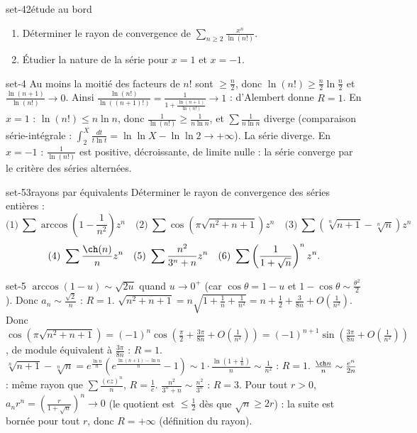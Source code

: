 \begin{exo}{set-4}{2}{étude au bord}
\begin{enumerate}
\item Déterminer le rayon de convergence de $\sum_{n\geq2}\frac{x^n}{\ln(n!)}$.
\item Étudier la nature de la série pour $x=1$ et $x=-1$.
\end{enumerate}
\end{exo}

\begin{corrige}{set-4}
 Au moins la moitié des facteurs de $n!$ sont $\geq\frac n2$, donc $\ln(n!)\geq\frac n2\ln\frac n2$ et $\frac{\ln(n+1)}{\ln(n!)}\to0$. Ainsi
$\frac{\ln(n!)}{\ln((n+1)!)}=\frac1{1+\frac{\ln(n+1)}{\ln(n!)}}\to1$ : d'Alembert donne $R=1$.
 En $x=1$ : $\ln(n!)\leq n\ln n$, donc $\frac1{\ln(n!)}\geq\frac1{n\ln n}$, et $\sum\frac1{n\ln n}$ diverge (comparaison série-intégrale :
$\int_2^X\frac{dt}{t\ln t}=\ln\ln X-\ln\ln2\to+\infty$). La série diverge. En $x=-1$ : $\frac1{\ln(n!)}$ est positive, décroissante, de limite nulle : la série
converge par le critère des séries alternées.
\end{corrige}

\begin{exo}{set-5}{3}{rayons par équivalents}
Déterminer le rayon de convergence des séries entières :
\[\text{(1)}\ \sum\arccos\left(1-\frac1{n^2}\right)z^n\quad\text{(2)}\ \sum\cos\left(\pi\sqrt{n^2+n+1}\right)z^n\quad\text{(3)}\ \sum\left(\sqrt[n]{n+1}-\sqrt[n]n\right)z^n\]
\[\text{(4)}\ \sum\frac{\ch(n)}nz^n\quad\text{(5)}\ \sum\frac{n^2}{3^n+n}z^n\quad\text{(6)}\ \sum\left(\frac1{1+\sqrt n}\right)^nz^n.\]
\end{exo}

\begin{corrige}{set-5}
 $\arccos(1-u)\sim\sqrt{2u}$ quand $u\to0^+$ (car $\cos\theta=1-u$ et $1-\cos\theta\sim\frac{\theta^2}2$). Donc $a_n\sim\frac{\sqrt2}n$ : $R=1$.
 $\sqrt{n^2+n+1}=n\sqrt{1+\frac1n+\frac1{n^2}}=n+\frac12+\frac3{8n}+O\left(\frac1{n^2}\right)$. Donc
$\cos\left(\pi\sqrt{n^2+n+1}\right)=(-1)^n\cos\left(\frac\pi2+\frac{3\pi}{8n}+O(\tfrac1{n^2})\right)=(-1)^{n+1}\sin\left(\frac{3\pi}{8n}+O(\tfrac1{n^2})\right)$, de module
équivalent à $\frac{3\pi}{8n}$ : $R=1$.
 $\sqrt[n]{n+1}-\sqrt[n]n=e^{\frac{\ln n}n}\left(e^{\frac{\ln(n+1)-\ln n}n}-1\right)\sim1\cdot\frac{\ln(1+\frac1n)}n\sim\frac1{n^2}$ : $R=1$.
 $\frac{\ch n}n\sim\frac{e^n}{2n}$ : même rayon que $\sum\frac{(ez)^n}n$, $R=\frac1e$.
 $\frac{n^2}{3^n+n}\sim\frac{n^2}{3^n}$ : $R=3$.
 Pour tout $r>0$, $a_nr^n=\left(\frac r{1+\sqrt n}\right)^n\to0$ (le quotient est $\leq\frac12$ dès que $\sqrt n\geq2r$) : la suite est bornée pour
tout $r$, donc $R=+\infty$ (définition du rayon).
\end{corrige}

